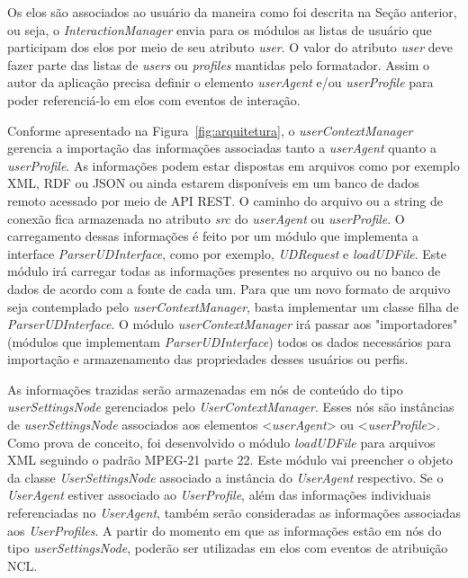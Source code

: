 Os elos são associados ao usuário da maneira como foi descrita na Seção anterior, ou seja, o \textit{InteractionManager} envia para os módulos as listas de usuário que participam dos elos por meio de seu atributo \textit{user}. O valor do atributo \textit{user} deve fazer parte das listas de \textit{users} ou \textit{profiles} mantidas pelo formatador. Assim o autor da aplicação precisa definir o elemento  \textit{userAgent} e/ou \textit{userProfile} para poder referenciá-lo em elos com eventos de interação.

Conforme apresentado na Figura~\ref{fig:arquitetura}, o \textit{userContextManager} gerencia a importação das informações associadas tanto a \textit{userAgent} quanto a \textit{userProfile}. As informações podem estar dispostas em arquivos como por exemplo XML, RDF ou JSON ou ainda estarem disponíveis em um banco de dados remoto  acessado por meio de API REST. O caminho do arquivo ou a string de conexão fica armazenada no atributo \textit{src} do \textit{userAgent} ou \textit{userProfile}. O carregamento dessas informações é feito por um módulo que implementa a interface \textit{ParserUDInterface}, como por exemplo, \textit{UDRequest} e \textit{loadUDFile}. Este módulo irá carregar todas as informações presentes no arquivo ou no banco de dados de acordo com a fonte de cada um. Para que um novo formato de arquivo seja contemplado pelo \textit{userContextManager}, basta implementar um classe filha de \textit{ParserUDInterface}. O módulo \textit{userContextManager} irá passar aos "importadores" (módulos que implementam \textit{ParserUDInterface}) todos os dados necessários para importação e armazenamento das propriedades desses usuários ou perfis. 

As informações trazidas serão armazenadas em nós de conteúdo do tipo \textit{userSettingsNode} gerenciados pelo \textit{UserContextManager}. Esses nós são instâncias de \textit{userSettingsNode} associados aos elementos  <\textit{userAgent}> ou <\textit{userProfile}>. Como prova de conceito, foi desenvolvido o módulo \textit{loadUDFile} para  arquivos XML seguindo o padrão MPEG-21 parte 22. Este módulo vai preencher o objeto da classe \textit{UserSettingsNode} associado a instância do \textit{UserAgent} respectivo.  Se o \textit{UserAgent} estiver associado ao \textit{UserProfile}, além das informações individuais referenciadas no \textit{UserAgent}, também serão consideradas as informações associadas aos \textit{UserProfiles}. A partir do momento em que as informações estão em nós do tipo \textit{userSettingsNode}, poderão ser utilizadas em elos com eventos de atribuição NCL.

